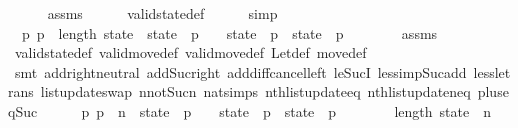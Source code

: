 \begin{isabellebody}
\ \ \ \ \isamarkupfalse%
\ assms\isanewline
\ \ \ \ \isamarkupfalse%
\ valid{\isacharunderscore}state{\isacharunderscore}def\isanewline
\ \ \ \ \isamarkupfalse%
\ simp\isanewline
\isanewline
\ \ \isamarkupfalse%
\ {\isachardoublequoteopen}{\isasymexists}{\isacharbang}\ p{}{\isachardot}\ p{}\ {\isacharless}\ length\ state\ {\isasymand}\ state\ {\isacharbang}\ p{}\ {\isachargreater}\ {}\ {\isasymand}\ state{\isacharprime}\ {\isacharbang}\ p{}\ {\isacharequal}\ state\ {\isacharbang}\ p{}\ {\isacharminus}\ {}{\isachardoublequoteclose}\isanewline
\ \ \ \ \isamarkupfalse%
\ assms\isanewline
\ \ \ \ \isamarkupfalse%
\ valid{\isacharunderscore}state{\isacharunderscore}def\ valid{\isacharunderscore}move{\isacharunderscore}def\ valid{\isacharunderscore}move{\isacharprime}{\isacharunderscore}def\ Let{\isacharunderscore}def\ move{\isacharunderscore}def\isanewline
\ \ \ \ \isamarkupfalse%
\ {\isacharparenleft}smt\ add{\isachardot}right{\isacharunderscore}neutral\ add{\isacharunderscore}Suc{\isacharunderscore}right\ add{\isacharunderscore}diff{\isacharunderscore}cancel{\isacharunderscore}left{\isacharprime}\ le{\isacharunderscore}SucI\ less{\isacharunderscore}imp{\isacharunderscore}Suc{\isacharunderscore}add\ less{\isacharunderscore}le{\isacharunderscore}trans\ list{\isacharunderscore}update{\isacharunderscore}swap\ n{\isacharunderscore}not{\isacharunderscore}Suc{\isacharunderscore}n\ nat{\isachardot}simps{\isacharparenleft}{}{\isacharparenright}\ nth{\isacharunderscore}list{\isacharunderscore}update{\isacharunderscore}eq\ nth{\isacharunderscore}list{\isacharunderscore}update{\isacharunderscore}neq\ plus{\isacharunderscore}{}{\isacharunderscore}eq{\isacharunderscore}Suc{\isacharparenright}\isanewline
\ \ \isamarkupfalse%
\ {\isacharasterisk}{\isacharcolon}\ {\isachardoublequoteopen}{\isasymexists}{\isacharbang}\ p{}{\isachardot}\ p{}\ {\isasymle}\ n\ {\isasymand}\ state\ {\isacharbang}\ p{}\ {\isachargreater}\ {}\ {\isasymand}\ state{\isacharprime}\ {\isacharbang}\ p{}\ {\isacharequal}\ state\ {\isacharbang}\ p{}\ {\isacharminus}\ {}{\isachardoublequoteclose}\isanewline
\ \ \ \ \isamarkupfalse%
\ {\isacharbackquoteopen}length\ state\ {\isacharequal}\ n\ {\isacharplus}\ {}{\isacharbackquoteclose}\isanewline
\ \ \ \ \isamarkupfalse%

\end{isabellebody}
